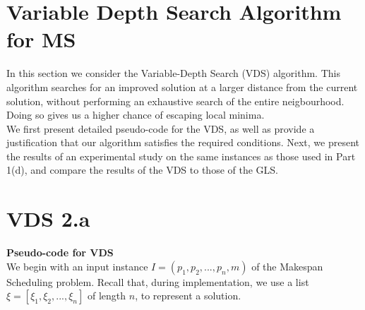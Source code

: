 \documentclass[12pt,a4paper,reqno]{article}
\begin{document}
\newpage













\section{Variable Depth Search Algorithm for MS} \label{sec:VDS}

In this section we consider the Variable-Depth Search (VDS) algorithm. This algorithm searches for an improved solution at a larger distance from the current solution, without performing an exhaustive search of the entire neigbourhood. Doing so gives us a higher chance of escaping local minima. \\

We first present detailed pseudo-code for the VDS, as well as provide a justification that our algorithm satisfies the required conditions. Next, we present the results of an experimental study on the same instances as those used in Part 1(d), and compare the results of the VDS to those of the GLS.

\section*{VDS 2.a}
\textbf{Pseudo-code for VDS}\\
We begin with an input instance $I = (p_1,p_2,...,p_n,m)$ of the Makespan Scheduling problem. Recall that, during implementation, we use a list $\xi = [\xi_1,\xi_2,...,\xi_n]$ of length $n$, to represent a solution.
\end{document}
